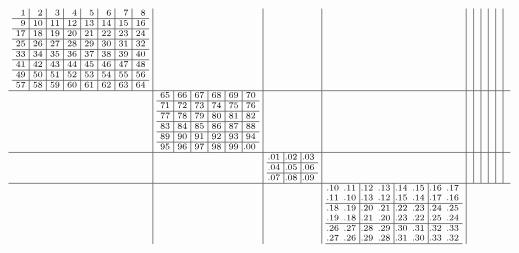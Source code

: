 \documentclass[12pt,a4paper,landscape]{amsart}
\begin{document}
\begin{align*}\scriptsize\arraycolsep3pt
  \begin{array}{c|c|c|c|c|c|c|c|c|c}
\begin{array}{r|r|r|r|r|r|r|r}%
1&2&3&4&5&6&7&8\\\hline%
9&10&11&12&13&14&15&16\\\hline%
17&18&19&20&21&22&23&24\\\hline%
25&26&27&28&29&30&31&32\\\hline%
33&34&35&36&37&38&39&40\\\hline%
41&42&43&44&45&46&47&48\\\hline%
49&50&51&52&53&54&55&56\\\hline%
57&58&59&60&61&62&63&64\\%
\end{array}%
&&&&&&&&&\\\hline
&
\begin{array}{r|r|r|r|r|r}%
65&66&67&68&69&70\\\hline%
71&72&73&74&75&76\\\hline%
77&78&79&80&81&82\\\hline%
83&84&85&86&87&88\\\hline%
89&90&91&92&93&94\\\hline%
95&96&97&98&99&\llap.00\\%
\end{array}%
&&&&&&&&\\\hline
&&
\begin{array}{r|r|r}%
\llap.01&\llap.02&\llap.03\\\hline%
\llap.04&\llap.05&\llap.06\\\hline%
\llap.07&\llap.08&\llap.09\\%
\end{array}%
&&&&&&&\\\hline
&&&
\begin{array}{rr|rr|rr|rr}%
\llap.10&\llap.11&\llap.12&\llap.13&\llap.14&\llap.15&\llap.16&\llap.17\\%
\llap.11&\llap.10&\llap.13&\llap.12&\llap.15&\llap.14&\llap.17&\llap.16\\\hline%
\llap.18&\llap.19&\llap.20&\llap.21&\llap.22&\llap.23&\llap.24&\llap.25\\%
\llap.19&\llap.18&\llap.21&\llap.20&\llap.23&\llap.22&\llap.25&\llap.24\\\hline%
\llap.26&\llap.27&\llap.28&\llap.29&\llap.30&\llap.31&\llap.32&\llap.33\\%
\llap.27&\llap.26&\llap.29&\llap.28&\llap.31&\llap.30&\llap.33&\llap.32\\\hline%

\end{array}
\end{array}
\end{align*}
\end{document}
